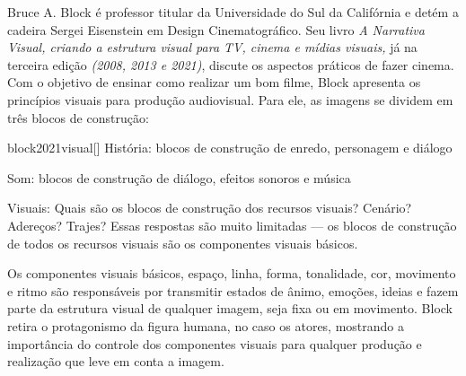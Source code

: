 Bruce A. Block é professor titular da Universidade do Sul da Califórnia
e detém a cadeira Sergei Eisenstein em Design Cinematográfico. Seu
livro \emph{A Narrativa Visual, criando a estrutura visual para TV,
	cinema e mídias visuais,} já na terceira edição \emph{(2008, 2013 e
	2021)}, discute os aspectos práticos de fazer cinema. Com o objetivo de
ensinar como realizar um bom filme, Block apresenta os princípios
visuais para produção audiovisual. Para ele, as imagens se dividem em
três blocos de construção:

\begin{displaycquote}[2]{block2021visual}[]
	História: blocos de construção de enredo, personagem e diálogo

	Som: blocos de construção de diálogo, efeitos sonoros e música

	Visuais: Quais são os blocos de construção dos recursos visuais?
	Cenário? Adereços? Trajes? Essas respostas são muito limitadas --- os
	blocos de construção de todos os recursos visuais são os componentes
	visuais básicos.
\end{displaycquote}

Os componentes visuais básicos, espaço, linha, forma, tonalidade, cor,
movimento e ritmo são responsáveis por transmitir estados de ânimo,
emoções, ideias e fazem parte da estrutura visual de qualquer imagem,
seja fixa ou em movimento. Block retira o protagonismo da figura
humana, no caso os atores, mostrando a importância do controle dos
componentes visuais para qualquer produção e realização que leve em
conta a imagem.


